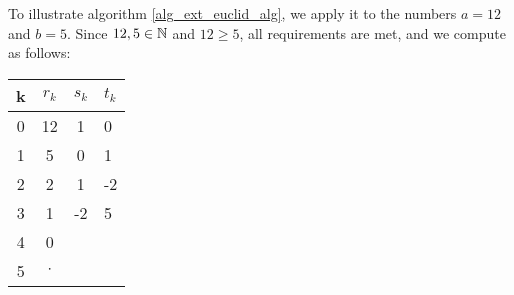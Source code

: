 \begin{example}
\label{example:extended_Euclidean_division_1}
To illustrate algorithm \ref{alg_ext_euclid_alg}, we apply it to the numbers $a=12$ and $b=5$. Since $12,5\in \mathbb{N}$ and $12\geq 5$, all requirements are met, and we compute as follows:
\begin{center}
  \begin{tabular}{c | c c l}
    k & $ r_k $ & $ s_k $ & $ t_k $ \\\hline
    0 & 12 & 1 & 0 \\
    1 & 5 & 0 & 1 \\
    2 & 2 & 1 & -2 \\
    3 & 1 & -2 & 5 \\
    4 & 0 &  &  \\
    5 & $\cdot$ & &\\
  \end{tabular}
  \end{center}

  
  \begin{comment}
  \begin{tabularx}{1.02\textwidth}{c| r  r  r  r@{}c@{\hspace{0.5cm}}>{\small}X>{\small}X>{\small}X>{\small}X@{}}
    k & $ r_k $ & $ s_k $ & $ t_k $ &$q_k$&&&&& \\\cline{1-5}
    0 & 12 & 1 & 0 &--&& $r_0 \gets a = 12$ & $s_0 \gets 1$ & $t_0 \gets 0$ & \\\\
    1 & 5 & 0 & 1 &--&& $r_1 \gets b = 5$ & $s_1 \gets 0$ & $t_1 \gets 1$ & \\\\
    2 & 2 & 1 & -2 &2 && $r_2 \gets \Zmod{r_0}{r_1} = \newline\Zmod{12}{5} = 2 $  & $s_2 \gets s_0 - q_2\cdot s_1 =\newline 1-2\cdot 0 = 1$ & $t_2 \gets t_0 - q_2\cdot t_1 =\newline 0 - 2\cdot 1 = -2$  &$q_2 \gets \Zdiv{r_0}{r_1} = \newline\Zdiv{12}{5} = 2$\\\\
    3 & 1 & -2 & 5 &2 && $r_3 \gets \Zmod{r_1}{r_2} =\newline \Zmod{5}{2} = 1 $  & $s_3 \gets s_1 - q_3\cdot s_2 =\newline 0-2\cdot 1 = -2$ & $t_3 \gets t_1 - q_3\cdot t_2 =\newline 1 - 2\cdot -2 = 5$   &$q_3 \gets \Zdiv{r_1}{r_2} = \newline\Zdiv{5}{2} = 2$\\\\
    4 & 0 & &  & &  &     $r_4 \gets \Zmod{r_2}{r_3} =\newline \Zmod{2}{1}= 0 $&  &  & \\
  \end{tabularx}
  

\end{comment}
\end{example}
